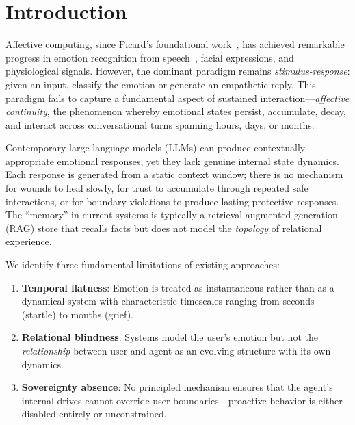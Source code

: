 \documentclass[10pt,twocolumn]{article}
\begin{document}
\section{Introduction}
\label{sec:intro}

Affective computing, since Picard's foundational work~\cite{picard1997affective}, has achieved remarkable progress in emotion recognition from speech~\cite{schuller2018speech}, facial expressions, and physiological signals. However, the dominant paradigm remains \emph{stimulus-response}: given an input, classify the emotion or generate an empathetic reply. This paradigm fails to capture a fundamental aspect of sustained interaction---\emph{affective continuity}, the phenomenon whereby emotional states persist, accumulate, decay, and interact across conversational turns spanning hours, days, or months.

Contemporary large language models (LLMs) can produce contextually appropriate emotional responses, yet they lack genuine internal state dynamics. Each response is generated from a static context window; there is no mechanism for wounds to heal slowly, for trust to accumulate through repeated safe interactions, or for boundary violations to produce lasting protective responses. The ``memory'' in current systems is typically a retrieval-augmented generation (RAG) store that recalls facts but does not model the \emph{topology} of relational experience.

We identify three fundamental limitations of existing approaches:

\begin{enumerate}[nosep,leftmargin=*]
\item \textbf{Temporal flatness}: Emotion is treated as instantaneous rather than as a dynamical system with characteristic timescales ranging from seconds (startle) to months (grief).
\item \textbf{Relational blindness}: Systems model the user's emotion but not the \emph{relationship} between user and agent as an evolving structure with its own dynamics.
\item \textbf{Sovereignty absence}: No principled mechanism ensures that the agent's internal drives cannot override user boundaries---proactive behavior is either disabled entirely or unconstrained.
\end{enumerate}
\end{document}
